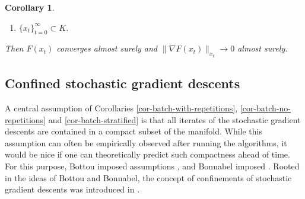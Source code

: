 \documentclass{amsart}
\newcommand{\ve}{\varepsilon}
\theoremstyle{plain}
\newtheorem{corollary}[theorem]{Corollary}
\theoremstyle{definition}
\theoremstyle{remark}
\numberwithin{theorem}{section}
\numberwithin{equation}{section}
\begin{document}
\begin{corollary}
\begin{enumerate}[1.]
\begin{enumerate}
	\begin{equation}\label{eq-SGD-update-batch-stratified-adaptive-learning-rate}
	\begin{cases}
	x_{t+1} = R_{x_t}\left(-\eta_t \widetilde{H}^t(x_t,\widetilde{\omega}^t)\right) \\
	\eta_t = \frac{\alpha}{(\beta + \sum_{p=0}^{t-1}\| \widetilde{H}^p(x_p,\widetilde{\omega}^p)\|_{x_p}^2)^{\frac{1}{2}+\ve}}
	\end{cases}\text{ for } t \geq 0, 
	\end{equation}
	\item $\{x_t\}_{t=0}^\infty \subset K$.
  \end{enumerate}
  Then  $F(x_t)$ converges almost surely and $\|\nabla F(x_t)\|_{x_t} \rightarrow 0$ almost surely.
\end{enumerate}
\end{corollary}


\subsection{Confined stochastic gradient descents} A central assumption of Corollaries \ref{cor-batch-with-repetitions}, \ref{cor-batch-no-repetitions} and \ref{cor-batch-stratified} is that all iterates of the stochastic gradient descents are contained in a compact subset of the manifold. While this assumption can often be empirically observed after running the algorithms, it would be nice if one can theoretically predict such compactness ahead of time. For this purpose, Bottou imposed assumptions \cite[(5.2-3)]{Bottou}, and Bonnabel imposed \cite[Theorem 3, Assumptions 1-3]{Bonnabel}. Rooted in the ideas of Bottou and Bonnabel, the concept of confinements of stochastic gradient descents was introduced in \cite{XYW-2024, YXW-2024}. 
\end{document}
